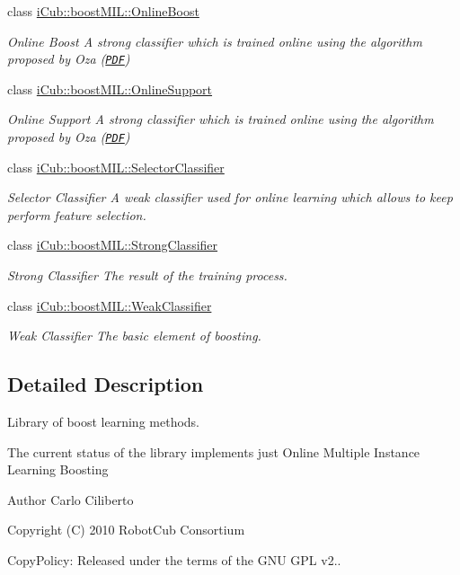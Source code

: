 \begin{DoxyCompactItemize}
class \hyperlink{classiCub_1_1boostMIL_1_1OnlineBoost}{i\+Cub\+::boost\+M\+I\+L\+::\+Online\+Boost}
\begin{DoxyCompactList}\small\item\em Online Boost A strong classifier which is trained online using the algorithm proposed by Oza (\href{http://ti.arc.nasa.gov/m/profile/oza/b2hd-oza05.html}{\tt P\+D\+F}) \end{DoxyCompactList}\item 
class \hyperlink{classiCub_1_1boostMIL_1_1OnlineSupport}{i\+Cub\+::boost\+M\+I\+L\+::\+Online\+Support}
\begin{DoxyCompactList}\small\item\em Online Support A strong classifier which is trained online using the algorithm proposed by Oza (\href{http://ti.arc.nasa.gov/m/profile/oza/b2hd-oza05.html}{\tt P\+D\+F}) \end{DoxyCompactList}\item 
class \hyperlink{classiCub_1_1boostMIL_1_1SelectorClassifier}{i\+Cub\+::boost\+M\+I\+L\+::\+Selector\+Classifier}
\begin{DoxyCompactList}\small\item\em Selector Classifier A weak classifier used for online learning which allows to keep perform feature selection. \end{DoxyCompactList}\item 
class \hyperlink{classiCub_1_1boostMIL_1_1StrongClassifier}{i\+Cub\+::boost\+M\+I\+L\+::\+Strong\+Classifier}
\begin{DoxyCompactList}\small\item\em Strong Classifier The result of the training process. \end{DoxyCompactList}\item 
class \hyperlink{classiCub_1_1boostMIL_1_1WeakClassifier}{i\+Cub\+::boost\+M\+I\+L\+::\+Weak\+Classifier}
\begin{DoxyCompactList}\small\item\em Weak Classifier The basic element of boosting. \end{DoxyCompactList}\end{DoxyCompactItemize}


\subsection{Detailed Description}
Library of boost learning methods. 

The current status of the library implements just Online Multiple Instance Learning Boosting

\begin{DoxyAuthor}{Author}
Carlo Ciliberto
\end{DoxyAuthor}
Copyright (C) 2010 Robot\+Cub Consortium

Copy\+Policy\+: Released under the terms of the G\+N\+U G\+P\+L v2.. 